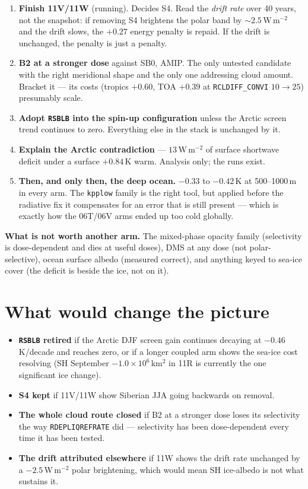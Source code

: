 \documentclass[10pt]{article}
\begin{document}
\begin{enumerate}\itemsep2pt
\item \textbf{Finish 11V/11W} (running). Decides S4. Read the \emph{drift rate} over 40
years, not the snapshot: if removing S4 brightens the polar band by ${\sim}2.5$\,W\,m$^{-2}$
and the drift slows, the $+0.27$ energy penalty is repaid. If the drift is unchanged, the
penalty is just a penalty.
\item \textbf{B2 at a stronger dose} against SB0, AMIP. The only untested candidate with
the right meridional shape and the only one addressing cloud amount. Bracket it --- its
costs (tropics $+0.60$, TOA $+0.39$ at \texttt{RCLDIFF\_CONVI} $10\to25$) presumably scale.
\item \textbf{Adopt \texttt{RSBLB} into the spin-up configuration} unless the Arctic screen
trend continues to zero. Everything else in the stack is unchanged by it.
\item \textbf{Explain the Arctic contradiction} --- $13$\,W\,m$^{-2}$ of surface shortwave
deficit under a surface $+0.84$\,K warm. Analysis only; the runs exist.
\item \textbf{Then, and only then, the deep ocean.} $-0.33$ to $-0.42$\,K at
500--1000\,m in every arm. The \texttt{kpplow} family is the right tool, but applied before
the radiative fix it compensates for an error that is still present --- which is exactly
how the 06T/06V arms ended up too cold globally.
\end{enumerate}

\textbf{What is not worth another arm.} The mixed-phase opacity family (selectivity is
dose-dependent and dies at useful doses), DMS at any dose (not polar-selective), ocean
surface albedo (measured correct), and anything keyed to sea-ice cover (the deficit is
beside the ice, not on it).

\section{What would change the picture}\label{sec:falsifiers}
\begin{itemize}\itemsep1pt
\item \textbf{\texttt{RSBLB} retired} if the Arctic DJF screen gain continues decaying at
$-0.46$\,K/decade and reaches zero, or if a longer coupled arm shows the sea-ice cost
resolving (SH September $-1.0\times10^6$\,km$^2$ in 11R is currently the one significant
ice change).
\item \textbf{S4 kept} if 11V/11W show Siberian JJA going backwards on removal.
\item \textbf{The whole cloud route closed} if B2 at a stronger dose loses its
selectivity the way \texttt{RDEPLIQREFRATE} did --- selectivity has been dose-dependent
every time it has been tested.
\item \textbf{The drift attributed elsewhere} if 11W shows the drift rate unchanged by a
$-2.5$\,W\,m$^{-2}$ polar brightening, which would mean SH ice-albedo is not what sustains
it.
\end{itemize}
\end{document}
